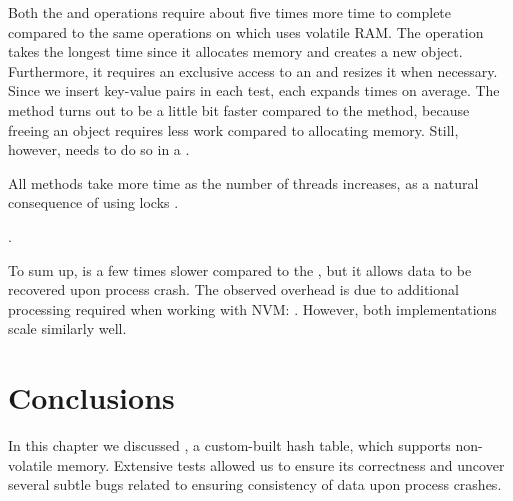     Both the \insertMethod and \removeMethod operations require about five times more time to complete compared to the same operations on \unorderedMap which uses volatile RAM. The \insertMethod operation takes the longest time since it allocates memory and creates a new object. Furthermore, it requires an exclusive access to an \internalHashMap and resizes it when necessary. Since we insert  key-value pairs in each test, each \internalHashMap expands  times on average. The \removeMethod method turns out to be a little bit faster compared to the \insertMethod method, because freeing an object requires less work compared to allocating memory. Still, however, \removeMethod needs to do so in a .
    
    All methods take more time as the number of threads increases, as a natural consequence of using locks . 
    
    \noindent {}.
    
    To sum up, \PHT is a few times slower compared to the \unorderedMap, but it allows data to be recovered upon process crash. The observed overhead is due to additional processing required when working with NVM: . However, both implementations scale similarly well. 
            
\section{Conclusions}
        
    In this chapter we discussed \PHT, a custom-built hash table, which supports non-volatile memory. 
    Extensive tests allowed us to ensure its correctness and uncover several subtle bugs related to ensuring consistency of data upon process crashes.
    
